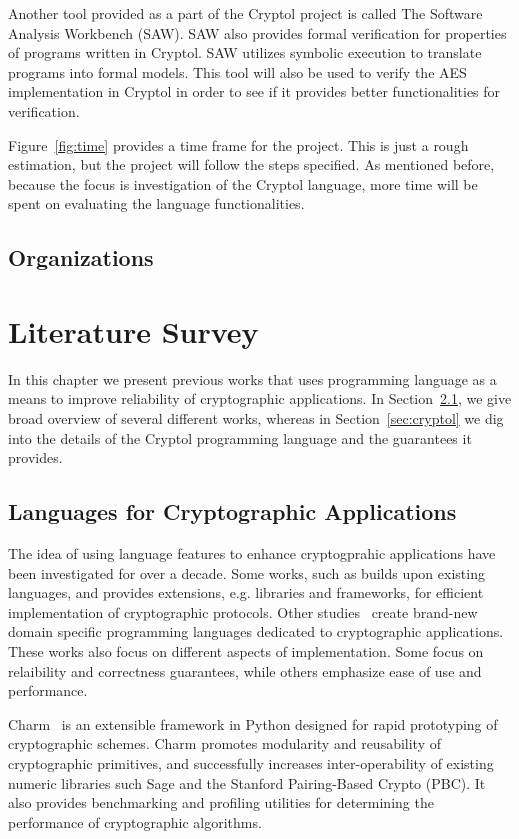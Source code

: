 \documentclass[a4paper, notitlepage]{report}
\begin{document}
Another tool provided as a part of the Cryptol project is called
The Software Analysis Workbench (SAW). SAW also provides formal verification
for properties of programs written in Cryptol.
SAW utilizes symbolic execution to translate programs into formal models.
This tool will also be used to verify the AES implementation in Cryptol
in order to see if it provides better functionalities for verification.

Figure~\ref{fig:time} provides a time frame for the project. This is just
a rough estimation, but the project will follow the steps specified.
As mentioned before, because the focus is investigation
of the Cryptol language, more time will be spent on evaluating the language
functionalities. 


\section{Organizations}

\newpage
\chapter{Literature Survey}

In this chapter we present previous works that uses programming
language as a means to improve reliability of cryptographic applications.
In Section~\ref{sec:crypto_lang}, we give broad overview of several different
works, whereas in Section~\ref{sec:cryptol} we dig into the details of
the Cryptol programming language and the guarantees it provides.

\section{Languages for Cryptographic Applications}
\label{sec:crypto_lang}

The idea of using language features to enhance cryptogprahic applications 
have been investigated for over a decade. Some works, such 
as \cite{akinyele2013charm} builds upon existing languages, and provides
extensions, e.g. libraries and frameworks, for efficient implementation 
of cryptographic protocols. 
Other studies~\cite{lewis2003cryptol} create brand-new domain specific 
programming languages dedicated to cryptographic applications. These
works also focus on different aspects of implementation. Some focus
on relaibility and correctness guarantees, while others emphasize ease 
of use and performance.

Charm~\cite{akinyele2013charm} is an extensible framework in Python 
designed for rapid prototyping of cryptographic schemes. Charm promotes
modularity and reusability of cryptographic primitives, and successfully 
increases inter-operability of existing numeric libraries such Sage and
the Stanford Pairing-Based Crypto (PBC). It also provides benchmarking
and profiling utilities for determining the performance of cryptographic
algorithms.
\end{document}
